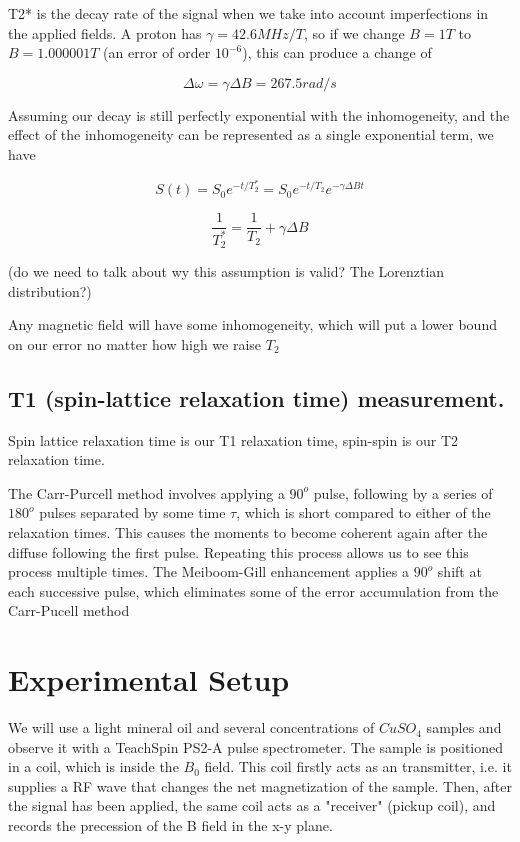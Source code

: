 \documentclass[12pt]{article}
\begin{document}
T2* is the decay rate of the signal when we take into account imperfections in the applied fields. A proton has $\gamma = 42.6 MHz/T$, so if we change $B= 1T$ to $B = 1.000001T$ (an error of order $10^{-6}$), this can produce a change of

\[\Delta \omega = \gamma \Delta B = 267.5 rad/s\]

Assuming our decay is still perfectly exponential with the inhomogeneity, and the effect of the inhomogeneity can be represented as a single exponential term, we have

\[S(t)=S_0e^{-t/T_2^*} = S_0e^{-t/T_2}e^{-\gamma \Delta B t}\]

\[\frac{1}{T_2^*} = \frac{1}{T_2} + \gamma \Delta B\]

(do we need to talk about wy this assumption is valid? The Lorenztian distribution?)

Any magnetic field will have some inhomogeneity, which will put a lower bound on our error no matter how high we raise $T_2$

\subsection{T1 (spin-lattice relaxation time) measurement.}

Spin lattice relaxation time is our T1 relaxation time, spin-spin is our T2 relaxation time.

The Carr-Purcell method involves applying a $90^o$ pulse, following by a series of $180^o$ pulses separated by some time $\tau$, which is short compared to either of the relaxation times. This causes the moments to become coherent again after the diffuse following the first pulse. Repeating this process allows us to see this process multiple times. The Meiboom-Gill enhancement applies a $90^o$ shift at each successive pulse, which eliminates some of the error accumulation from the Carr-Pucell method


\section{ Experimental Setup}

We will use a light mineral oil and several concentrations of $CuSO_4$ samples and observe it with a TeachSpin PS2-A pulse spectrometer.
The sample is positioned in a coil, which is inside the $B_0$ field. This coil firstly acts as an transmitter, i.e. it supplies a RF wave that changes the net magnetization of the sample. Then, after the signal has been applied, the same coil acts as a "receiver" (pickup coil), and records the precession of the B field in the x-y plane.
\end{document}
